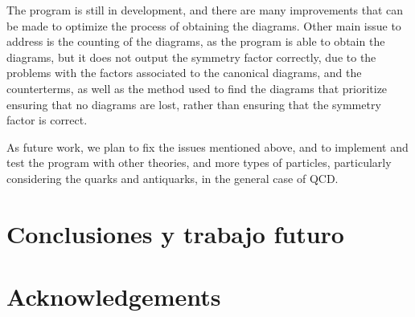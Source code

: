 \documentclass[11pt,a4paper,twoside,pdf]{article}
\numberwithin{equation}{section}
\begin{document}
The program is still in development, and there are many improvements that can
be made to optimize the process of obtaining the diagrams. Other main issue to 
address is the counting of the diagrams, as the program is able to obtain the diagrams, 
but it does not output the symmetry factor correctly, due to the problems with the factors 
associated to the canonical diagrams, and the counterterms, as well as the method
used to find the diagrams that prioritize ensuring that no diagrams are lost, rather than
ensuring that the symmetry factor is correct.

As future work, we plan to fix the issues mentioned above, and to implement and 
test the program with other theories, and more types of particles, particularly
considering the quarks and antiquarks, in the general case of QCD. 

\section{Conclusiones y trabajo futuro} \label{sec:conclusions_es}



\section{Acknowledgements}

\newpage

\end{document}
